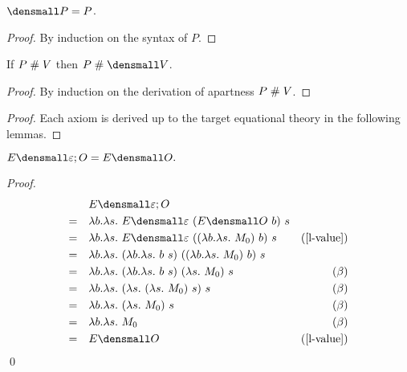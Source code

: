 \begin{lemma}
  \label{thm:pattern-translation}

  $\den{P} = P$.
\end{lemma}
\begin{proof}
  By induction on the syntax of $P$.
\end{proof}

\begin{lemma}
  \label{thm:apartness-translation}

  If $P \mathrel{\#} V$ then $P \apart \den{V}$.
\end{lemma}
\begin{proof}
  By induction on the derivation of apartness $P \mathrel{\#} V$.
\end{proof}

\thmsoundness*
\begin{proof}
  Each axiom is derived up to the target equational theory in the following lemmas.
\end{proof}

\begin{lemma}
  \label{thm:ext-compose-id-left}
    $ E\den{\varepsilon; O} = E\den{O}.$
\end{lemma}
    \begin{proof}
        \begin{align*}
            &\quad E\den{\varepsilon; O} \\
            =& \quad \lambda b. \lambda s.~ E\den{\varepsilon} ~(E\den{O} ~b) ~s \\
            =&  \quad \lambda b. \lambda s.~ E\den{\varepsilon} ~((\lambda b. \lambda s.~ M_0) ~b) ~s & (\cref{l-value})\\
            =& \quad \lambda b. \lambda s.~ (\lambda b. \lambda s.~ b ~s) ~((\lambda b. \lambda s.~ M_0) ~b) ~s \\
            =& \quad \lambda b. \lambda s.~ (\lambda b. \lambda s.~ b ~s) ~(\lambda s.~ M_0) ~s & (\beta)\\
            =& \quad \lambda b. \lambda s.~ (\lambda s.~ (\lambda s.~ M_0) ~s) ~s & (\beta)\\
            =& \quad \lambda b. \lambda s.~ (\lambda s.~ M_0) ~s & (\beta)\\
            =& \quad \lambda b. \lambda s.~ M_0 & (\beta) \\
            =& \quad E\den{O} & (\cref{l-value})
        \end{align*}
        \qed
    \end{proof}

